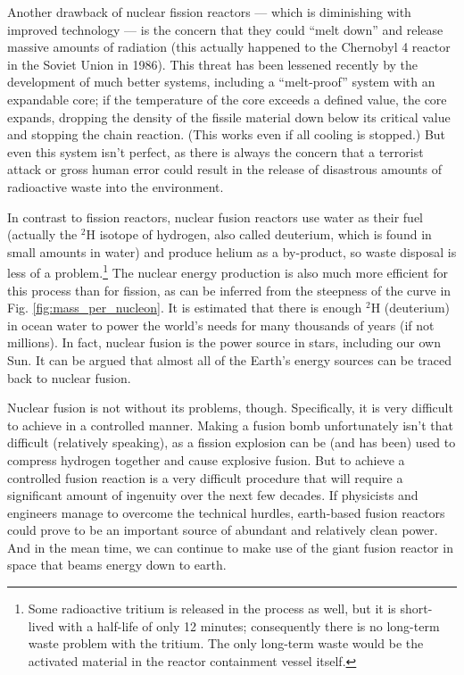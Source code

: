 Another drawback of nuclear fission reactors --- which is diminishing with
improved technology --- is the concern that they could ``melt down''
and release massive amounts of radiation (this actually happened to
the Chernobyl 4 reactor in the Soviet Union in 1986).  This threat has been
lessened recently by the development of much better systems, including
a ``melt-proof'' system with an expandable core; if the temperature of
the core exceeds a defined value, the core expands, dropping the
density of the fissile material down below its critical value and
stopping the chain reaction.  (This works even if all cooling is
stopped.)  But even this system isn't perfect, as there is always the
concern that a terrorist attack or gross human error could result in
the release of disastrous amounts of radioactive waste into the
environment.

In contrast to fission reactors,  nuclear fusion reactors use water as
their  fuel  (actually the  $^2$H  isotope  of  hydrogen, also  called
deuterium,  which is  found in  small  amounts in  water) and  produce
helium   as  a   by-product,  so   waste   disposal  is   less  of   a
problem.\footnote{Some radioactive tritium  is released in the process
  as well, but it is short-lived  with a half-life of only 12 minutes;
  consequently  there   is  no   long-term  waste  problem   with  the
  tritium. The only long-term waste would be the activated material in
  the reactor  containment vessel  itself.}  The nuclear energy  production is
also much more efficient for this  process than for fission, as can be
inferred     from     the     steepness     of    the     curve     in
Fig. \ref{fig:mass_per_nucleon}.  It is estimated that there is enough
$^2$H (deuterium) in  ocean water to power the  world's needs for many
thousands of years (if not  millions).  In fact, nuclear fusion is the
power source in  stars, including our own Sun.  It  can be argued that
almost all of the Earth's energy sources can be traced back to nuclear
fusion.
     
Nuclear fusion is not  without its problems, though.  Specifically, it
is very difficult to achieve  in a controlled manner.  Making a fusion
bomb unfortunately isn't that  difficult (relatively speaking), as a
fission  explosion can  be (and  has been)  used to  compress hydrogen
together  and cause  explosive fusion.   But to  achieve  a controlled
fusion  reaction is  a very  difficult procedure  that will  require a
significant  amount  of  ingenuity  over  the next  few  decades.   If
physicists  and engineers  manage to  overcome the  technical hurdles,
earth-based fusion reactors  could prove to be an  important source of
abundant and relatively  clean power. And in the mean  time, we can 
continue to make use of the
giant fusion reactor in space that beams energy down to earth.



